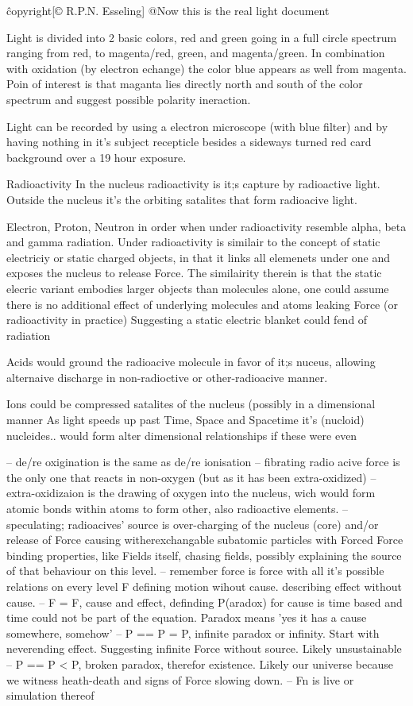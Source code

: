 \^copyright{[© R.P.N. Esseling]}
@Now this is the real light document

Light is divided into 2 basic colors, red and green going in a full circle spectrum ranging from red, to magenta/red, green, and magenta/green.
In combination with oxidation (by electron echange) the color blue appears as well from magenta. 
Poin of interest is that maganta lies directly north and south of the color spectrum and suggest possible polarity ineraction.

Light can be recorded by using a electron microscope (with blue filter) and by having nothing in it's subject recepticle besides a sideways turned red card background over a 19 hour exposure.

Radioactivity
In the nucleus radioactivity is it;s capture by radioactive light.
Outside the nucleus it's the orbiting satalites that form radioacive light.

Electron, Proton, Neutron in order when under radioactivity resemble alpha, beta and gamma radiation.
Under radioactivity is similair to the concept of static electriciy or static charged objects, in that it links all elemenets under one and exposes the nucleus to release Force.
The similairity therein is that the static elecric variant embodies larger objects than molecules alone, one could assume there is  no additional effect of underlying molecules and atoms leaking Force (or radioactivity in practice)
Suggesting a static electric blanket could fend of radiation

Acids would ground the radioacive molecule in favor of it;s nuceus, allowing alternaive discharge in non-radioctive or other-radioacive manner.

Ions could be compressed satalites of the nucleus (possibly in a dimensional manner
As light speeds up past Time, Space and Spacetime it's (nucloid) nucleides.. would form alter dimensional relationships if these were even 

-- de/re oxigination is the same as de/re ionisation
-- fibrating radio acive force is the only one that reacts in non-oxygen (but as it has been extra-oxidized)
-- extra-oxidizaion is the drawing of oxygen into the nucleus, wich would form atomic bonds within atoms to form other, also radioactive elements.
-- speculating; radioacives' source is over-charging of the nucleus (core) and/or release of Force causing witherexchangable subatomic particles with Forced Force binding properties,
like Fields itself, chasing fields, possibly explaining the source of that behaviour on this level.
-- remember force is force with all it's possible relations on every level F defining motion wihout cause. describing effect without cause.
-- F = F, cause and effect, definding P(aradox) for cause is time based and time could not be part of the equation. Paradox means 'yes it has a cause somewhere, somehow'
-- P == P = P, infinite paradox or infinity. Start with neverending effect. Suggesting infinite Force without source. Likely unsustainable
-- P == P < P, broken paradox, therefor existence. Likely our universe because we witness heath-death and signs of Force slowing down.
-- Fn is live or simulation thereof
